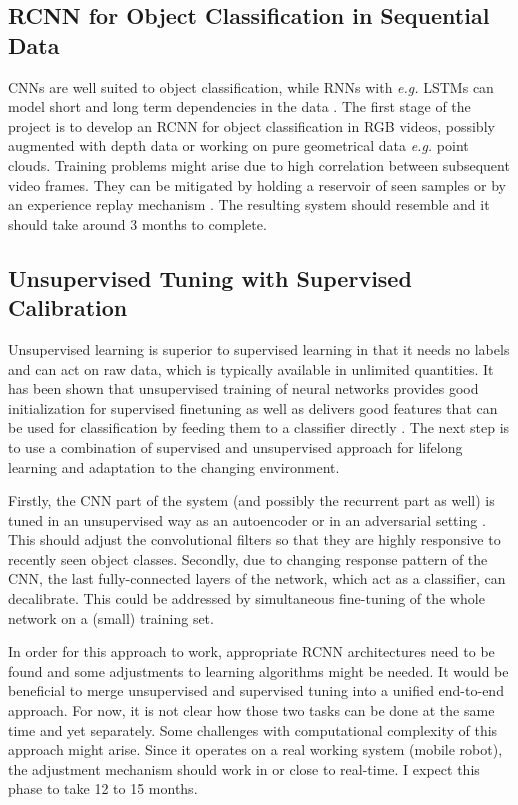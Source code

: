 \documentclass[12pt]{article}
\begin{document}
\subsection{RCNN for Object Classification in Sequential Data}

CNNs are well suited to object classification, while RNNs with \emph{e.g.} LSTMs can model short and long term dependencies in the data \cite{rcnn}. The first stage of the project is to develop an RCNN for object classification in RGB videos, possibly augmented with depth data or working on pure geometrical data \emph{e.g.} point clouds. Training problems might arise due to high correlation between subsequent video frames. They can be mitigated by holding a reservoir of seen samples \cite{reservoir} or by an experience replay mechanism \cite{dqn}. The resulting system should resemble \cite{rcnn} and it should take around 3 months to complete.

\subsection{Unsupervised Tuning with Supervised Calibration}

Unsupervised learning is superior to supervised learning in that it needs no labels and can act on raw data, which is typically available in unlimited quantities. It has been shown that unsupervised training of neural networks provides good initialization for supervised finetuning \cite{autoencoders} as well as delivers good features that can be used for classification by feeding them to a classifier directly \cite{adversarial}. The next step is to use a combination of supervised and unsupervised approach for lifelong learning and adaptation to the changing environment. 

Firstly, the CNN part of the system (and possibly the recurrent part as well) is tuned in an unsupervised way as an autoencoder or in an adversarial setting \cite{adversarial}. This should adjust the convolutional filters so that they are highly responsive to recently seen object classes. Secondly, due to changing response pattern of the CNN, the last fully-connected layers of the network, which act as a classifier, can decalibrate. This could be addressed by simultaneous fine-tuning of the whole network on a (small) training set.

In order for this approach to work, appropriate RCNN architectures need to be found and some adjustments to learning algorithms might be needed. It would be beneficial to merge unsupervised and supervised tuning into a unified end-to-end approach. For now, it is not clear how those two tasks can be done at the same time and yet separately. Some challenges with computational complexity of this approach might arise. Since it operates on a real working system (mobile robot), the adjustment mechanism should work in or close to real-time. I expect this phase to take 12 to 15 months.
\end{document}
